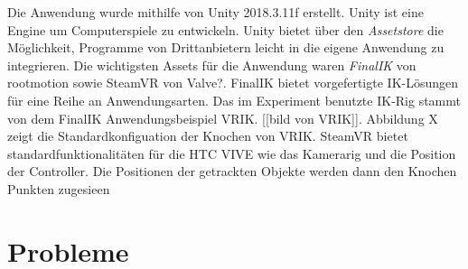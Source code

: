 Die Anwendung wurde mithilfe von Unity 2018.3.11f erstellt. Unity ist eine Engine um Computerspiele zu entwickeln. Unity bietet über den \textit{Assetstore} die Möglichkeit, Programme von Drittanbietern leicht in die eigene Anwendung zu integrieren. Die wichtigsten Assets für die Anwendung waren \textit{FinalIK} von rootmotion\cite{rootmotion} sowie SteamVR von Valve?. FinalIK bietet vorgefertigte IK-Lösungen für eine Reihe an Anwendungsarten. Das im Experiment benutzte IK-Rig stammt von dem FinalIK Anwendungsbeispiel VRIK. [[bild von VRIK]]. Abbildung X zeigt die Standardkonfiguation der Knochen von VRIK. SteamVR bietet standardfunktionalitäten für die HTC VIVE wie das Kamerarig und die Position der Controller. Die Positionen der getrackten Objekte werden dann den Knochen Punkten zugesieen

\section{Probleme}


 
